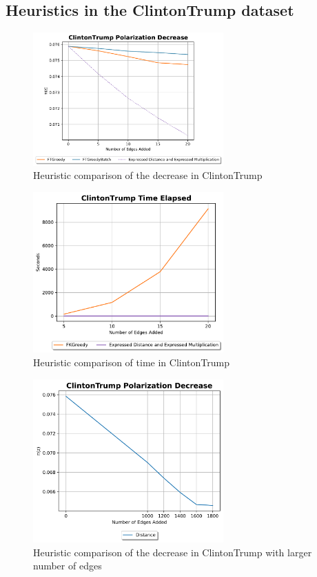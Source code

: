 \subsection{Heuristics in the ClintonTrump dataset}
\begin{figure}[H]
	\centering
	\includegraphics[width=0.65\textwidth]{Figures/ClintonTrump Polarization Decrease}
	\caption{Heuristic comparison of the decrease in ClintonTrump}
	\label{fig:ClintonTrump_pol}
\end{figure}


\begin{figure}[H]
	\centering
	\includegraphics[width=0.65\textwidth]{Figures/ClintonTrump Time Elapsed}
	\caption{Heuristic comparison of time in ClintonTrump}
	\label{fig:ClintonTrump_time}
\end{figure}
\clearpage

\begin{figure}[H]
	\centering
	\includegraphics[width=0.65\textwidth]{Figures/ClintonTrump Polarization Decrease 2}
	\caption{Heuristic comparison of the decrease in ClintonTrump with larger number of edges}
	\label{fig:ClintonTrump_pol}
\end{figure}


